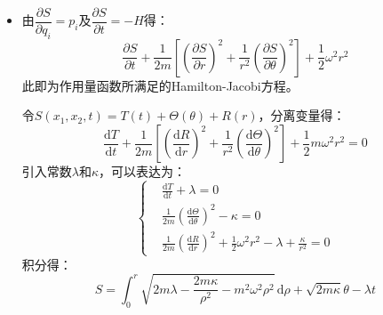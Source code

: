 \documentclass[a4paper,fontset=windows]{ctexart}
\begin{document}
\begin{itemize}
        各个$\omega_i$为：
        \[
        \omega_i = \frac{\partial E}{\partial I_i} = \omega
        \]
        \medskip

        \item[3.(g)]
        由$\dfrac{\partial S}{\partial q_i} = p_i$及$\dfrac{\partial S}{\partial t} = -H$得：
        \[
        \frac{\partial S}{\partial t} + \frac{1}{2m}\left[\left(\frac{\partial S}{\partial r}\right)^2 + \frac{1}{r^2}\left(\frac{\partial S}{\partial\theta}\right)^2\right] + \frac{1}{2}\omega^2 r^2
        \]
        此即为作用量函数所满足的Hamilton-Jacobi方程。

        令$S(x_1,x_2,t) = T(t) + \varTheta(\theta) + R(r)$，分离变量得：
        \[
        \frac{\mathrm{d}T}{\mathrm{d}t} + \frac{1}{2m}\left[\left(\frac{\mathrm{d}R}{\mathrm{d}r}\right)^2 + \frac{1}{r^2}\left(\frac{\mathrm{d}\varTheta}{\mathrm{d}\theta}\right)^2\right] + \frac{1}{2}m\omega^2 r^2 = 0
        \]
        引入常数$\lambda$和$\kappa$，可以表达为：
        \[
        \left\{
        \begin{aligned}
            &\frac{\mathrm{d}T}{\mathrm{d}t} + \lambda = 0 \\
            &\frac{1}{2m}\left(\frac{\mathrm{d}\varTheta}{\mathrm{d}\theta}\right)^2 - \kappa = 0 \\
            &\frac{1}{2m}\left(\frac{\mathrm{d}R}{\mathrm{d}r}\right)^2 + \frac{1}{2}\omega^2 r^2 - \lambda + \frac{\kappa}{r^2} = 0
        \end{aligned}
        \right.
        \]
        积分得：
        \[
        S = \int_0^r \sqrt{2m\lambda - \frac{2m\kappa}{\rho^2} - m^2 \omega^2 \rho^2}\,\mathrm{d}\rho + \sqrt{2m\kappa}\theta - \lambda t
        \]
        \medskip


\end{itemize}
\end{document}
